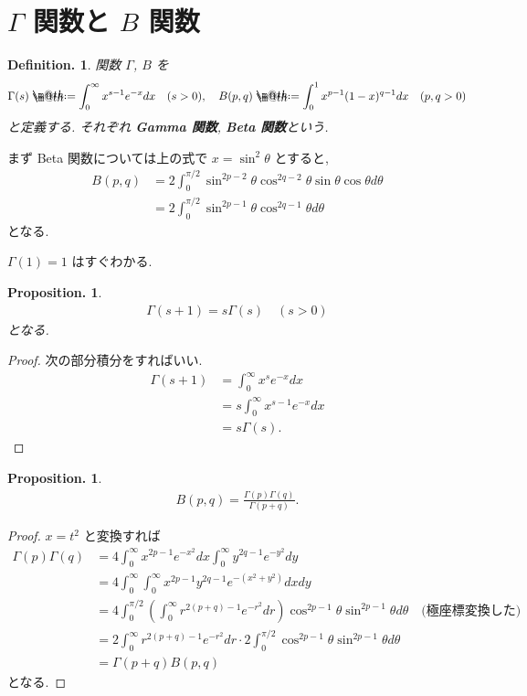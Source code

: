 \documentclass[openany, a4paper, oneside]{jsbook}
\makeatletter
\newcommand*{\defeq}{\mathrel{\rlap{%
\raisebox{0.3ex}{$\m@th\cdot$}}%
\raisebox{-0.3ex}{$\m@th\cdot$}}%
=}
\theoremstyle{break}
\newtheorem{prop}[thm]{Proposition.}
\theoremstyle{breakdefn}
\newtheorem{defn}[thm]{Definition.}
\makeatother
\begin{document}
\section{$\Gamma$ 関数と $B$ 関数}


\begin{defn}
関数 $\Gamma$, $B$ を
\begin{align}
 \Gamma (s)
 \defeq
 \int_0^{\infty} x^{s-1} e^{-x} dx \quad (s > 0 ),
 \quad
 B(p, q)
 \defeq
 \int_0^1 x^{p-1}(1-x)^{q-1} dx \quad (p, q > 0)
\end{align}
と定義する.
それぞれ \textbf{Gamma 関数}, \textbf{Beta 関数}という.
\end{defn}
まず Beta 関数については上の式で $x = \sin^2 \theta$ とすると,
\begin{align}
 B(p, q)
 &=
 2 \int_0^{\pi/2} \sin^{2p-2} \theta \cos^{2q-2} \theta \sin \theta \cos \theta d \theta \\
 &=
 2\int_0^{\pi/2} \sin^{2p-1} \theta \cos^{2q-1}\theta d\theta
\end{align}
となる.

$\Gamma(1) = 1$ はすぐわかる.
\begin{prop}
\begin{align}
 \Gamma(s+1)
 =
 s \Gamma (s) \quad (s>0)
\end{align}
となる.
\end{prop}
\begin{proof}
次の部分積分をすればいい.
\begin{align}
 \Gamma(s + 1)
 &=
 \int_0^{\infty} x^s e^{-x} dx \\
 &=
 s \int_0^{\infty} x^{s-1} e^{-x} dx \\
 &=
 s\Gamma(s).
\end{align}
\end{proof}

\begin{prop}
\begin{align}
 B(p, q)
 =
 \frac{\Gamma(p) \Gamma(q)}{\Gamma(p+q)}.
\end{align}
\end{prop}
\begin{proof}
$x = t^2$ と変換すれば
\begin{align}
 \Gamma(p) \Gamma(q)
 &=
 4 \int_0^{\infty}x^{2p-1} e^{-x^2}dx \int_0^{\infty}y^{2q-1} e^{-y^2} dy \\
 &=
 4 \int_0^{\infty} \int_0^{\infty} x^{2p-1} y^{2q-1} e^{-(x^2+y^2)} dxdy \\
 &=
 4 \int_0^{\pi/2} \left( \int_0^{\infty} r^{2(p+q)-1} e^{-r^2} dr \right)
  \cos^{2p-1}\theta \sin^{2p-1}\theta d\theta
  \quad \text{(極座標変換した)} \\
 &=
 2\int_0^{\infty} r^{2(p+q)-1} e^{-r^2} dr
  \cdot 2\int_0^{\pi/2} \cos^{2p-1}\theta \sin^{2p-1}\theta d\theta  \\
 &=
 \Gamma(p+q)B(p, q)
\end{align}
となる.
\end{proof}
\end{document}
